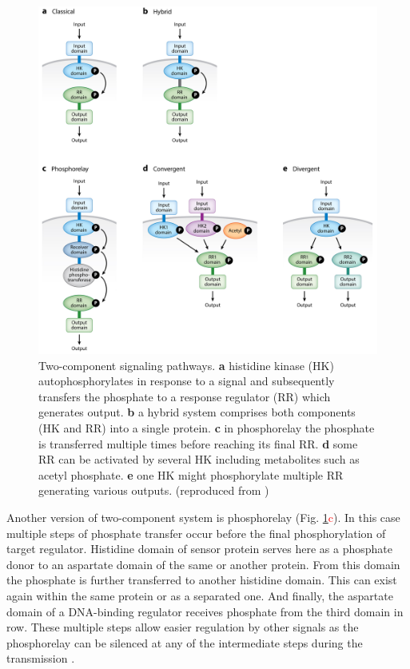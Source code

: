 \begin{figure}[h!]
  \centering
  \includegraphics[scale=0.85]{text/Pictures/TwoComponent.jpeg}
	\caption{Two-component signaling pathways. \textbf{a} histidine kinase (HK) autophosphorylates in response to a signal and subsequently transfers the phosphate to a response regulator (RR) which generates output. \textbf{b} a hybrid system comprises both components (HK and RR) into a single protein. \textbf{c} in phosphorelay the phosphate is transferred multiple times before reaching its final RR. \textbf{d} some RR can be activated by several HK including metabolites such as acetyl phosphate. \textbf{e} one HK might phosphorylate multiple RR generating various outputs. (reproduced from \cite{groisman2016feedback})}
	\label{two}
\end{figure}

Another version of two-component system is phosphorelay (Fig. \ref{two}\textcolor{red}{c}).
In this case multiple steps of phosphate transfer occur before the final phosphorylation of target regulator.
Histidine domain of sensor protein serves here as a phosphate donor to an aspartate domain of the same or another protein.
From this domain the phosphate is further transferred to another histidine domain.
This can exist again within the same protein or as a separated one.
And finally, the aspartate domain of a DNA-binding regulator receives phosphate from the third domain in row.
These multiple steps allow easier regulation by other signals as the phosphorelay can be silenced at any of the intermediate steps during the transmission \cite{perego2001pentapeptide, groisman2016feedback}.

